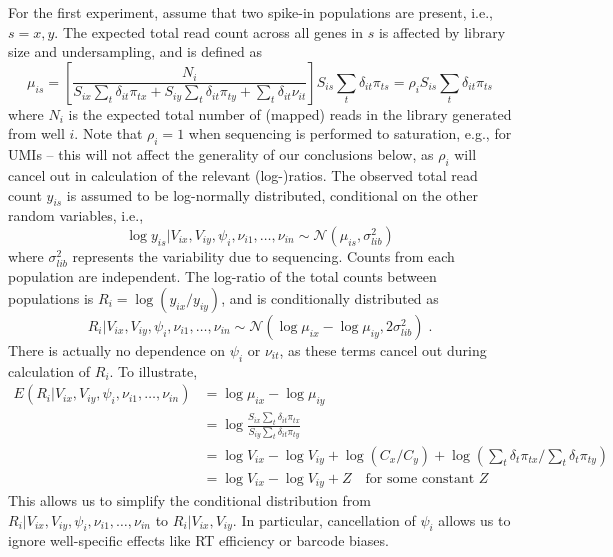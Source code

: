 \documentclass{article}
\begin{document}
For the first experiment, assume that two spike-in populations are present, i.e., $s=x,y$.
The expected total read count across all genes in $s$ is affected by library size and undersampling, and is defined as
\[
\mu_{is} = \left[\frac{N_i}{S_{ix}\sum_t \delta_{it}\pi_{tx} + S_{iy}\sum_t \delta_{it}\pi_{ty} + \sum_t \delta_{it} \nu_{it}}\right] S_{is}\sum_t \delta_{it}\pi_{ts}
= \rho_i  S_{is}\sum_t \delta_{it}\pi_{ts}
\]
where $N_i$ is the expected total number of (mapped) reads in the library generated from well $i$.
Note that $\rho_i=1$ when sequencing is performed to saturation, e.g., for UMIs -- this will not affect the generality of our conclusions below, as $\rho_i$ will cancel out in calculation of the relevant (log-)ratios.
The observed total read count $y_{is}$ is assumed to be log-normally distributed, conditional on the other random variables, i.e., 
\[
\log y_{is} | V_{ix}, V_{iy}, \psi_i, \nu_{i1}, \ldots, \nu_{in} \sim \mathcal{N}(\mu_{is}, \sigma^2_{lib})
\]
where $\sigma^2_{lib}$ represents the variability due to sequencing.
Counts from each population are independent.
The log-ratio of the total counts between populations is $R_i = \log(y_{ix}/y_{iy})$, and is conditionally distributed as
\[
R_i | V_{ix}, V_{iy},  \psi_i, \nu_{i1}, \ldots, \nu_{in} \sim \mathcal{N}( \log \mu_{ix} - \log \mu_{iy}, 2\sigma^2_{lib} ) \;. 
\]
There is actually no dependence on $\psi_i$ or $\nu_{it}$, as these terms cancel out during calculation of $R_i$.
To illustrate, 
\begin{align*}
E(R_i | V_{ix}, V_{iy},  \psi_i, \nu_{i1}, \ldots, \nu_{in} ) &= \log \mu_{ix} - \log \mu_{iy} \\
&= \log \frac{ S_{ix } \sum_t \delta_{it} \pi_{tx} } { S_{iy}\sum_t \delta_{it} \pi_{ty} } \\
&= \log V_{ix} - \log V_{iy} + \log (C_x/C_y) + \log (\textstyle\sum_t \delta_{t} \pi_{tx}/\textstyle\sum_t \delta_{t} \pi_{ty}) \\
&= \log V_{ix} - \log V_{iy } + Z \quad\mbox{for some constant } Z
\end{align*}
This allows us to simplify the conditional distribution from $R_i | V_{ix}, V_{iy},  \psi_i, \nu_{i1}, \ldots, \nu_{in}$ to $R_i | V_{ix}, V_{iy}$.
In particular, cancellation of $\psi_i$ allows us to ignore well-specific effects like RT efficiency or barcode biases.
\end{document}
